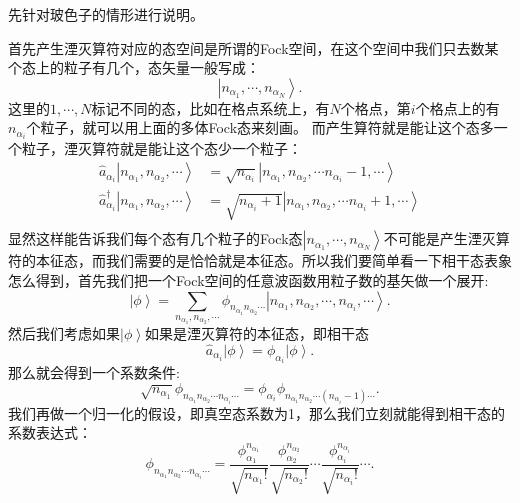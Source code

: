 \documentclass[12pt, a4paper, oneside]{ctexart}
\begin{document}
先针对玻色子的情形进行说明。

首先产生湮灭算符对应的态空间是所谓的Fock空间，在这个空间中我们只去数某个态上的粒子有几个，态矢量一般写成：
\begin{equation}
    \left| n_{\alpha_1},\cdots,n_{\alpha_N}  \right>.
\end{equation}
这里的$1,\cdots,N$标记不同的态，比如在格点系统上，有$N$个格点，第$i$个格点上的有$n_{\alpha_i}$个粒子，就可以用上面的多体Fock态来刻画。
而产生算符就是能让这个态多一个粒子，湮灭算符就是能让这个态少一个粒子：
\begin{align}
    \hat a_{\alpha_i}\left| n_{\alpha_1},n_{\alpha_2},\cdots  \right>&=\sqrt{n_{\alpha_i}} \left| n_{\alpha_1},n_{\alpha_2},\cdots  n_{\alpha_i}-1,\cdots\right>\nonumber\\ 
    \hat a_{\alpha_i}^\dagger\left| n_{\alpha_1},n_{\alpha_2},\cdots  \right>&=\sqrt{n_{\alpha_i}+1} \left| n_{\alpha_1},n_{\alpha_2},\cdots  n_{\alpha_i}+1,\cdots\right>\\
\end{align}
显然这样能告诉我们每个态有几个粒子的Fock态$\left| n_{\alpha_1},\cdots,n_{\alpha_N}  \right>$不可能是产生湮灭算符的本征态，而我们需要的是恰恰就是本征态。所以我们要简单看一下相干态表象怎么得到，首先我们把一个Fock空间的任意波函数用粒子数的基矢做一个展开:
\begin{equation}
    \left|  \phi \right>=\sum_{n_{\alpha_1},n_{\alpha_2},\cdots}\phi_{n_{\alpha_1}n_{\alpha_2}\cdots}\left|  n_{\alpha_1},n_{\alpha_2},\cdots,n_{\alpha_i},\cdots \right>.
\end{equation}
然后我们考虑如果$\left| \phi \right>$如果是湮灭算符的本征态，即相干态
\begin{equation}
    \hat a_{\alpha_i}\left| \phi  \right>=\phi_{\alpha_i}\left| \phi  \right>.
\end{equation}
那么就会得到一个系数条件:
\begin{equation}
    \sqrt{n_{\alpha_1}}\phi_{n_{\alpha_1}n_{\alpha_2}\cdots n_{\alpha_i}\cdots}=\phi_{\alpha_i}\phi_{n_{\alpha_1}n_{\alpha_2}\cdots (n_{\alpha_i}-1)\cdots}.
\end{equation}
我们再做一个归一化的假设，即真空态系数为1，那么我们立刻就能得到相干态的系数表达式：
\begin{equation}
    \phi_{n_{\alpha_1}n_{\alpha_2}\cdots n_{\alpha_i}\cdots}=\frac{\phi_{\alpha_1}^{n_{\alpha_1}}}{\sqrt{n_{\alpha_1}!}}\frac{\phi_{\alpha_2}^{n_{\alpha_2}}}{\sqrt{n_{\alpha_2}!}}\cdots\frac{\phi_{\alpha_i}^{n_{\alpha_i}}}{\sqrt{n_{\alpha_i}!}}\cdots.
\end{equation}
\end{document}
